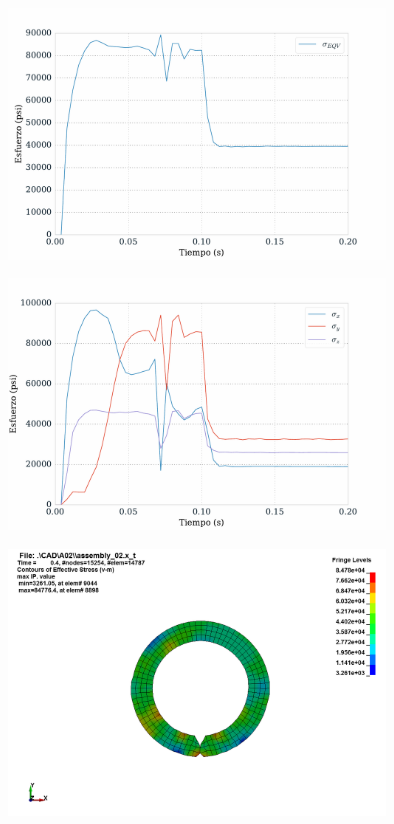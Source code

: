 \begin{center}
\includegraphics[width=0.75\textwidth]{src/ch4/von_mises_stress_01.pdf}
\label{fig:von_mises_stress_01}
\end{center}

\begin{center}
\includegraphics[width=0.75\textwidth]{src/ch4/xyz_stress_01.pdf}
\label{fig:xyz_stress_01}
\end{center}

\begin{center}
\includegraphics[width=0.75\textwidth]{src/ch4/von_mises_02.png}
\label{fig:von_mises_01}
\end{center}


